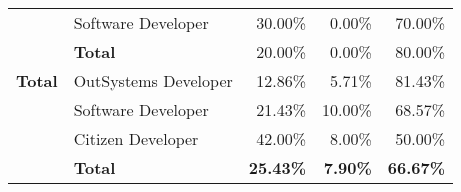 \begin{table}[tb]
\begin{tabular}{llrrr}
                              & Software Developer   & 30.00\%                                                           & 0.00\%                                                                  & 70.00\%                                                       \\
                              & \textbf{Total}       & 20.00\%                                                           & 0.00\%                                                                  & 80.00\%                                                       \\ \hline
    \rowcolor[HTML]{EFEFEF} 
    \textbf{Total}            & OutSystems Developer & 12.86\%                                                           & 5.71\%                                                                  & 81.43\%                                                       \\
    \rowcolor[HTML]{EFEFEF} 
                              & Software Developer   & 21.43\%                                                           & 10.00\%                                                                 & 68.57\%                                                       \\
    \rowcolor[HTML]{EFEFEF} 
                              & Citizen Developer    & 42.00\%                                                           & 8.00\%                                                                  & 50.00\%                                                       \\
    \rowcolor[HTML]{EFEFEF} 
                              & \textbf{Total}       & \textbf{25.43\%}                                                  & \textbf{7.90\%}                                                         & \textbf{66.67\%}                                              \\ \hline
    \end{tabular}
    \end{table}

